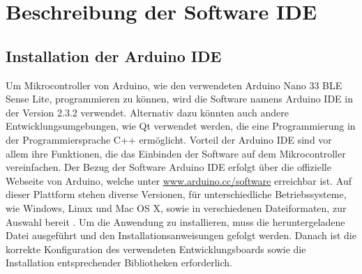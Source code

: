 

\chapter{Beschreibung der Software IDE}

\section{Installation der Arduino IDE}
Um Mikrocontroller von Arduino, wie den verwendeten Arduino Nano 33 BLE Sense Lite, programmieren zu können, wird die Software namens Arduino IDE in der Version 2.3.2 verwendet. 
Alternativ dazu könnten auch andere Entwicklungsumgebungen, wie Qt verwendet werden, die eine Programmierung in der Programmiersprache C++ ermöglicht.
Vorteil der Arduino IDE sind vor allem ihre Funktionen, die das Einbinden der Software auf dem Mikrocontroller vereinfachen.
Der Bezug der Software Arduino IDE erfolgt über die offizielle Webseite von Arduino, welche unter \url{www.arduino.cc/software} erreichbar ist. Auf dieser Plattform stehen diverse Versionen, für unterschiedliche Betriebssysteme, wie Windows, Linux und Mac OS X, sowie in verschiedenen Dateiformaten, zur Auswahl bereit \cite{Arduino.2024}. Um die Anwendung zu installieren, muss die heruntergeladene Datei ausgeführt und den Installationsanweisungen gefolgt werden. Danach ist die korrekte Konfiguration des verwendeten Entwicklungsboards sowie die Installation entsprechender Bibliotheken erforderlich.

